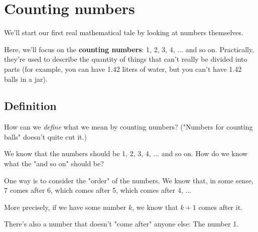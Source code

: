 


\section{Counting numbers}

We'll start our first real mathematical tale by looking at numbers themselves. 

Here, we'll focus on the \textbf{counting numbers}: 1, 2, 3, 4, ... and so on. Practically, they're used to describe the quantity of things that can't really be divided into parts (for example, you can have 1.42 liters of water, but you can't have 1.42 balls in a jar). 

\subsection{Definition}

How can we \emph{define} what we mean by counting numbers? ("Numbers for counting balls" doesn't quite cut it.)

We know that the numbers should be 1, 2, 3, 4, ... and so on. How do we know what the "and so on" should be?

One way is to consider the "order" of the numbers. We know that, in some sense, 7 comes after 6, which comes after 5, which comes after 4, ... 

More precisely, if we have some number $k$, we know that $k+1$ comes after it. 

There's also a number that doesn't "come after" anyone else: The number 1.

